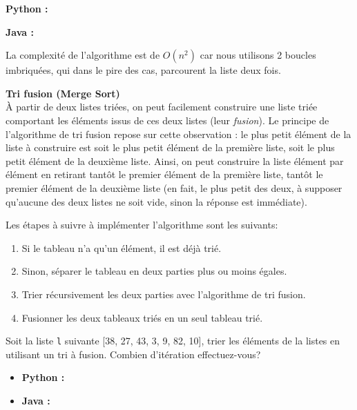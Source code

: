 \begin{Exercice} [20 minutes]
    \begin{solution}
        \textbf{Python :}
             
        \textbf{Java :}
            
    
    La complexité de l'algorithme est de $O(n^2)$ car nous utilisons 2 boucles imbriquées, qui dans le pire des cas, parcourent la liste deux fois.
    \end{solution}
    
\end{Exercice}

\begin{Exercice} [30 minutes] \textbf{Tri fusion (Merge Sort)} \\
    À partir de deux listes triées, on peut facilement construire une liste triée comportant les éléments issus de ces deux listes (leur \textit{fusion}). Le principe de l'algorithme de tri fusion repose sur cette observation : le plus petit élément de la liste à construire est soit le plus petit élément de la première liste, soit le plus petit élément de la deuxième liste. Ainsi, on peut construire la liste élément par élément en retirant tantôt le premier élément de la première liste, tantôt le premier élément de la deuxième liste (en fait, le plus petit des deux, à supposer qu'aucune des deux listes ne soit vide, sinon la réponse est immédiate). 
    
    Les étapes à suivre à implémenter l'algorithme sont les suivants:
    \begin{enumerate}
        \item Si le tableau n'a qu'un élément, il est déjà trié.
        \item Sinon, séparer le tableau en deux parties plus ou moins égales.
        \item Trier récursivement les deux parties avec l'algorithme de tri fusion.
        \item Fusionner les deux tableaux triés en un seul tableau trié.
    \end{enumerate}
    
    Soit la liste \lstinline{l} suivante [38, 27, 43, 3, 9, 82, 10], trier les éléments de la listes en utilisant un tri à fusion. Combien d'itération effectuez-vous?
    
    \begin{itemize}
        \item \textbf{Python :}
            
        \item \textbf{Java :}
            
    \end{itemize}
    

\end{Exercice}
